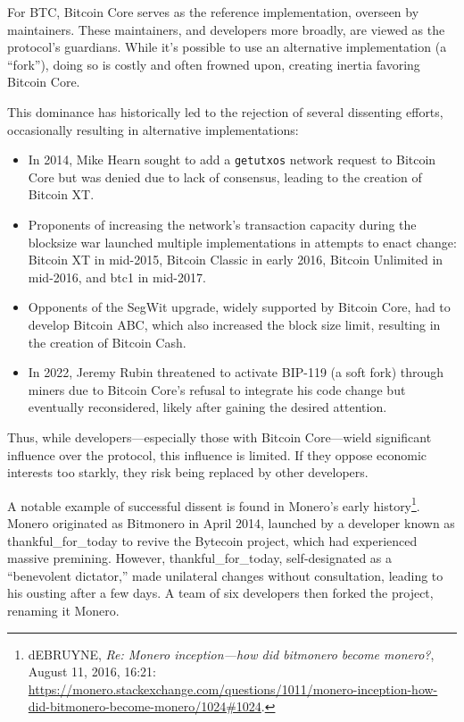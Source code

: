 \documentclass[
  a5paper,
  smalldemyvopaper,10pt,twoside,onecolumn,openright,extrafontsizes,hidelinks]{memoir}
\begin{document}
For BTC, Bitcoin Core serves as the reference implementation, overseen
by maintainers. These maintainers, and developers more broadly, are
viewed as the protocol's guardians. While it's possible to use an
alternative implementation (a ``fork''), doing so is costly and often
frowned upon, creating inertia favoring Bitcoin Core.

This dominance has historically led to the rejection of several
dissenting efforts, occasionally resulting in alternative
implementations:

\begin{itemize}
\item
  In 2014, Mike Hearn sought to add a \texttt{getutxos} network request
  to Bitcoin Core but was denied due to lack of consensus, leading to
  the creation of Bitcoin XT.
\item
  Proponents of increasing the network's transaction capacity during the
  blocksize war launched multiple implementations in attempts to enact
  change: Bitcoin XT in mid-2015, Bitcoin Classic in early 2016, Bitcoin
  Unlimited in mid-2016, and btc1 in mid-2017.
\item
  Opponents of the SegWit upgrade, widely supported by Bitcoin Core, had
  to develop Bitcoin ABC, which also increased the block size limit,
  resulting in the creation of Bitcoin Cash.
\item
  In 2022, Jeremy Rubin threatened to activate BIP-119 (a soft fork)
  through miners due to Bitcoin Core's refusal to integrate his code
  change but eventually reconsidered, likely after gaining the desired
  attention.
\end{itemize}

Thus, while developers---especially those with Bitcoin Core---wield
significant influence over the protocol, this influence is limited. If
they oppose economic interests too starkly, they risk being replaced by
other developers.

A notable example of successful dissent is found in Monero's early
history\footnote{dEBRUYNE, \emph{Re: Monero inception---how did
  bitmonero become monero?}, August 11, 2016, 16:21:
  \url{https://monero.stackexchange.com/questions/1011/monero-inception-how-did-bitmonero-become-monero/1024\#1024}.}.
Monero originated as Bitmonero in April 2014, launched by a developer
known as thankful\_for\_today to revive the Bytecoin project, which had
experienced massive premining. However, thankful\_for\_today,
self-designated as a ``benevolent dictator,'' made unilateral changes
without consultation, leading to his ousting after a few days. A team of
six developers then forked the project, renaming it Monero.
\end{document}
